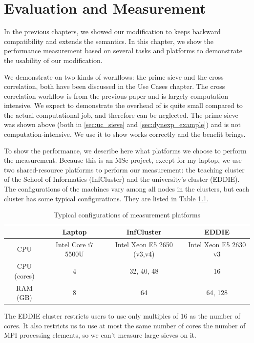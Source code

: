 \chapter{Evaluation and Measurement}
In the previous chapters, we showed our modification to \dpy keeps backward compatibility and extends the semantics. In this chapter, we show the performance measurement based on several tasks and platforms to demonstrate the usability of our modification.

We demonstrate on two kinds of workflows: the prime sieve and the cross correlation, both have been discussed in the Use Cases chapter. The cross correlation workflow is from the previous \dpy paper and is largely computation-intensive. We expect to demonstrate the overhead of \tincdep is quite small compared to the actual computational job, and therefore can be neglected. The prime sieve was shown above (both in \ref{sec:uc_sieve} and \ref{sec:dynexp_example}) and is not computation-intensive. We use it to show \tdynexp works correctly and the benefit \tdynexp brings.

To show the performance, we describe here what platforms we choose to perform the measurement. Because this is an MSc project, except for my laptop, we use two shared-resource platforms to perform our measurement: the teaching cluster of the School of Informatics (InfCluster) and the university's cluster (EDDIE).
The configurations of the machines vary among all nodes in the clusters, but each cluster has some typical configurations. They are listed in Table \ref{tbl:list_measurement}.

\begin{table}[h]
\centering
\begin{tabular}{|c|c|c|c|}
\hline
 & Laptop & InfCluster & EDDIE \\ \hline
CPU & Intel Core i7 5500U & Intel Xeon E5 2650 (v3,v4) & Intel Xeon E5 2630 v3 \\ \hline
CPU (cores) & 4 & 32, 40, 48 & 16 \\ \hline
RAM (GB) & 8 & 64 & 64, 128 \\ \hline
\end{tabular}
\caption{Typical configurations of measurement platforms}
\label{tbl:list_measurement}
\end{table}

The EDDIE cluster restricts users to use only multiples of 16 as the number of cores. It also restricts us to use at most the same number of cores the number of MPI processing elements, so we can't measure large sieves on it.

